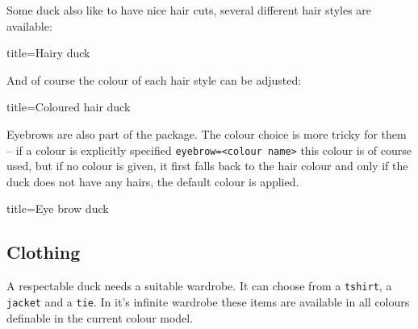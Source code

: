\documentclass[parskip=half]{scrartcl}
\begin{document}
Some duck also like to have nice hair cuts, several different hair styles are available:
\begin{tcblisting}{title={Hairy duck}}
\begin{tikzpicture}
	\duck[longhair]
\end{tikzpicture}
\begin{tikzpicture}
	\duck[shorthair]
\end{tikzpicture}

\begin{tikzpicture}
	\duck[crazyhair]
\end{tikzpicture}
\begin{tikzpicture}
	\duck[recedinghair]
\end{tikzpicture}
\end{tcblisting}

And of course the colour of each hair style can be adjusted:
\begin{tcblisting}{title={Coloured hair duck}}
\begin{tikzpicture}
	\duck[longhair=teal]
\end{tikzpicture}
\end{tcblisting}

Eyebrows are also part of the package. The colour choice is more tricky for them -- if a colour is explicitly specified \lstinline|eyebrow=<colour name>| this colour is of course used, but if no colour is given, it first falls back to the hair colour and only if the duck does not have any hairs, the default colour is applied.

\begin{tcblisting}{title={Eye brow duck}}
\begin{tikzpicture}
	\duck[eyebrow]
\end{tikzpicture}
\begin{tikzpicture}
	\duck[longhair=blue, 
		eyebrow]
\end{tikzpicture}

\begin{tikzpicture}
	\duck[crazyhair=red, 
		eyebrow=blue]
\end{tikzpicture}
\end{tcblisting}

\clearpage
\subsection{Clothing}

A respectable duck needs a suitable wardrobe. It can choose from a \lstinline|tshirt|, a \lstinline|jacket| and a \lstinline|tie|. In it's infinite wardrobe these items are available in all colours definable in the current colour model.
\end{document}
